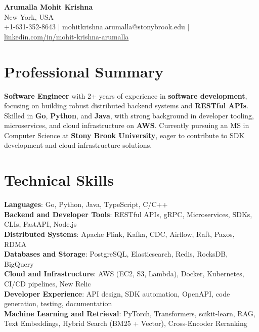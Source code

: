 \documentclass[letterpaper,11pt]{article}
\begin{document}
\begin{center}
  {\Large \textbf{Arumalla Mohit Krishna}} \\
  New York, USA \\
  +1-631-352-8643 \enspace | \enspace mohitkrishna.arumalla@stonybrook.edu \enspace | \enspace \href{https://www.linkedin.com/in/mohit-krishna-arumalla}{linkedin.com/in/mohit-krishna-arumalla}
\end{center}

\section{Professional Summary}
  \begin{itemize}[leftmargin=0.15in, label={}]
    \small{\item{
     \textbf{Software Engineer} with 2+ years of experience in \textbf{software development}, focusing on building robust distributed backend systems and \textbf{RESTful APIs}. Skilled in \textbf{Go}, \textbf{Python}, and \textbf{Java}, with strong background in developer tooling, microservices, and cloud infrastructure on \textbf{AWS}. Currently pursuing an MS in Computer Science at \textbf{Stony Brook University}, eager to contribute to SDK development and cloud infrastructure solutions.
    }}
  \end{itemize}
\vspace{-16pt}

\section{Technical Skills}
 \begin{itemize}[leftmargin=0.15in, label={}]
    \small{\item{
     \textbf{Languages}: Go, Python, Java, TypeScript, C/C++ \\
     \textbf{Backend and Developer Tools}: RESTful APIs, gRPC, Microservices, SDKs, CLIs, FastAPI, Node.js \\
     \textbf{Distributed Systems}: Apache Flink, Kafka, CDC, Airflow, Raft, Paxos, RDMA \\
     \textbf{Databases and Storage}: PostgreSQL, Elasticsearch, Redis, RocksDB, BigQuery \\
     \textbf{Cloud and Infrastructure}: AWS (EC2, S3, Lambda), Docker, Kubernetes, CI/CD pipelines, New Relic \\
     \textbf{Developer Experience}: API design, SDK automation, OpenAPI, code generation, testing, documentation\\
     \textbf{Machine Learning and Retrieval}: PyTorch, Transformers, scikit-learn, RAG, Text Embeddings, Hybrid Search (BM25 + Vector), Cross-Encoder Reranking
    }}
 \end{itemize}
\vspace{-16pt}
\end{document}
